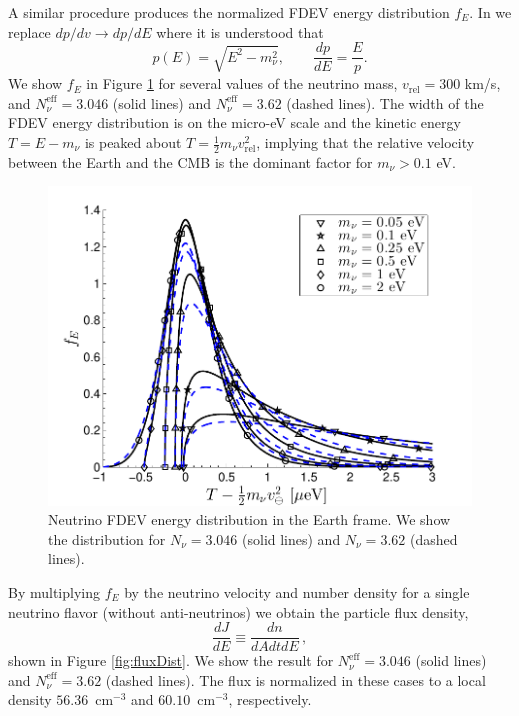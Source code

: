 A similar procedure produces the normalized FDEV energy distribution $f_E$.  In  we replace $dp/dv\to dp/dE$ where it is understood that 
\begin{equation}
p(E)=\sqrt{E^2-m_\nu^2},\qquad \frac{dp}{dE}=\frac{E}{p}.
\end{equation}
We show $f_E$ in Figure \ref{fig:EDist300}  for several values of the neutrino mass, $v_{\text{rel}}=300$ km/s, and $N_\nu^{\mathrm{eff}}=3.046$ (solid lines) and $N_\nu^{\mathrm{eff}}=3.62$ (dashed lines). The width of the FDEV energy distribution is on the micro-eV scale and the kinetic energy $T=E-m_\nu$ is peaked about $T=\frac{1}{2}m_\nu v_{\text{rel}}^2$, implying that the relative velocity between the Earth and the CMB is the dominant factor for $m_\nu>0.1$ eV.

\begin{figure}
\centerline{\includegraphics[width=0.9\linewidth]{plots/E_dist_300.pdf}}
\caption{Neutrino FDEV energy distribution in the Earth frame. We show the distribution for $N_\nu=3.046$ (solid lines) and $N_\nu=3.62$ (dashed lines). }
\label{fig:EDist300}
 \end{figure}

By multiplying $f_E$ by the neutrino velocity and number density for a single neutrino flavor (without anti-neutrinos) we obtain the particle flux density,
 \begin{equation}
 \frac{dJ}{dE}\equiv\frac{dn}{dAdtdE}\,,
\end{equation} 
shown in Figure \ref{fig:fluxDist}. We show the result for $N_\nu^{\mathrm{eff}}=3.046$ (solid lines) and $N_\nu^{\mathrm{eff}}=3.62$ (dashed lines). The flux is normalized in these cases to a local density $56.36$~cm${}^{-3}$ and $60.10$~cm${}^{-3}$, respectively. 

